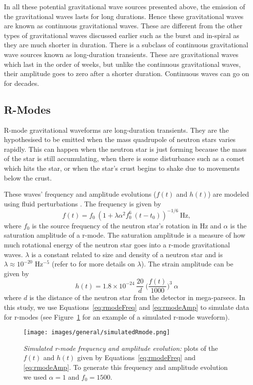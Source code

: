 \documentclass[%
reprint,
amsmath,amssymb,
aps,
]{revtex4-1}
\begin{document}
	In all these potential gravitational wave sources presented above, the emission of the gravitational waves lasts for long durations. Hence these gravitational waves are known as continuous gravitational waves. These are different from the other types of gravitational waves discussed earlier such as the burst and in-spiral as they are much shorter in duration. There is a subclass of continuous gravitational wave sources known as long-duration transients. These are gravitational waves which last in the order of weeks, but unlike the continuous gravitational waves, their amplitude goes to zero after a shorter duration. Continuous waves can go on for decades. 
	
	
	\subsection{R-Modes}
	R-mode gravitational waveforms are long-duration transients. They are the hypothesised to be emitted when the mass quadrupole of neutron stars varies rapidly. This can happen when the neutron star is just forming because the mass of the star is still accumulating, when there is some disturbance such as a comet which hits the star, or when the star's crust begins to shake due to movements below the crust. 
	
	These waves' frequency and amplitude evolutions ($f(t)$  and $h(t)$) are modeled using fluid perturbations \cite{rmodeEqs}. The frequency is given by
	\begin{equation} \label{eq:rmodeFreq}
	f(t)= f_0 \ (1 + \lambda \alpha^2 f_0^6\ (t-t_0))^{-1/6} \ \text{Hz},
	\end{equation}
	where $f_0$ is the source frequency of the neutron star's rotation in Hz and $\alpha$ is the saturation amplitude of a r-mode. The saturation amplitude is a measure of how much rotational energy of the neutron star goes into a
	r-mode gravitational waves. $\lambda$ is a constant related to size and density of a neutron star and is $\lambda \approx 10^{-20}$ Hz$^{-5}$ (refer to \cite{rmodeFreq} for more details on $\lambda$). The strain amplitude can be given by 
	\begin{equation} \label{eq:rmodeAmp}
	h(t) = 1.8\times 10^{-24} \ \frac{20}{d} \ \bigg(\frac{f(t)}{1000}\bigg)^3 \ \alpha
	\end{equation}
	\noindent where $d$ is the distance of the neutron star from the detector in mega-parsecs. In this study, we use Equations~\ref{eq:rmodeFreq} and \ref{eq:rmodeAmp} to simulate data for r-modes (see Figure~\ref{fig:rmodeEvol} for an example of a simulated r-mode waveform). 
	\begin{figure}[h]
		\centering
		\texttt{[image: images/general/simulatedRmode.png]}
		\caption{\textit{Simulated r-mode frequency and amplitude evolution:} plots of the $f(t)$ and $h(t)$ given by Equations~\ref{eq:rmodeFreq} and \ref{eq:rmodeAmp}. To generate this frequency and amplitude evolution we used $\alpha = 1$ and $f_0 = 1500$.}
		\label{fig:rmodeEvol}
	\end{figure}
	
\end{document}
